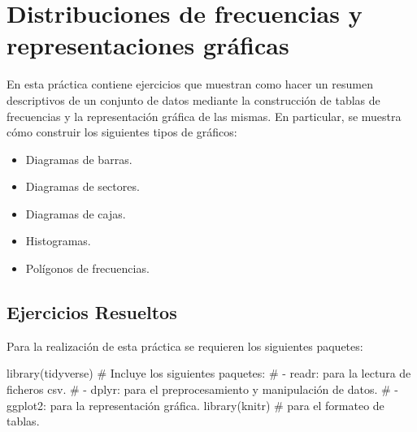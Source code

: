 \documentclass[
  a4paper,
]{scrreport}
\newenvironment{Shaded}{\begin{snugshade}}{\end{snugshade}}
\newcommand{\CommentTok}[1]{\textcolor[rgb]{0.37,0.37,0.37}{#1}}
\newcommand{\FunctionTok}[1]{\textcolor[rgb]{0.28,0.35,0.67}{#1}}
\newcommand{\NormalTok}[1]{\textcolor[rgb]{0.00,0.23,0.31}{#1}}
\providecommand{\tightlist}{%
  \setlength{\itemsep}{0pt}\setlength{\parskip}{0pt}}\usepackage{longtable,booktabs,array}
\theoremstyle{definition}
\theoremstyle{remark}
\begin{document}

\chapter{Distribuciones de frecuencias y representaciones
gráficas}\label{distribuciones-de-frecuencias-y-representaciones-gruxe1ficas}

En esta práctica contiene ejercicios que muestran como hacer un resumen
descriptivos de un conjunto de datos mediante la construcción de tablas
de frecuencias y la representación gráfica de las mismas. En particular,
se muestra cómo construir los siguientes tipos de gráficos:

\begin{itemize}
\tightlist
\item
  Diagramas de barras.
\item
  Diagramas de sectores.
\item
  Diagramas de cajas.
\item
  Histogramas.
\item
  Polígonos de frecuencias.
\end{itemize}

\section{Ejercicios Resueltos}\label{ejercicios-resueltos-2}

Para la realización de esta práctica se requieren los siguientes
paquetes:

\begin{Shaded}
\begin{Highlighting}[]
\FunctionTok{library}\NormalTok{(tidyverse) }
\CommentTok{\# Incluye los siguientes paquetes:}
\CommentTok{\# {-} readr: para la lectura de ficheros csv. }
\CommentTok{\# {-} dplyr: para el preprocesamiento y manipulación de datos.}
\CommentTok{\# {-} ggplot2: para la representación gráfica.}
\FunctionTok{library}\NormalTok{(knitr) }\CommentTok{\# para el formateo de tablas.}
\end{Highlighting}
\end{Shaded}
\end{document}
